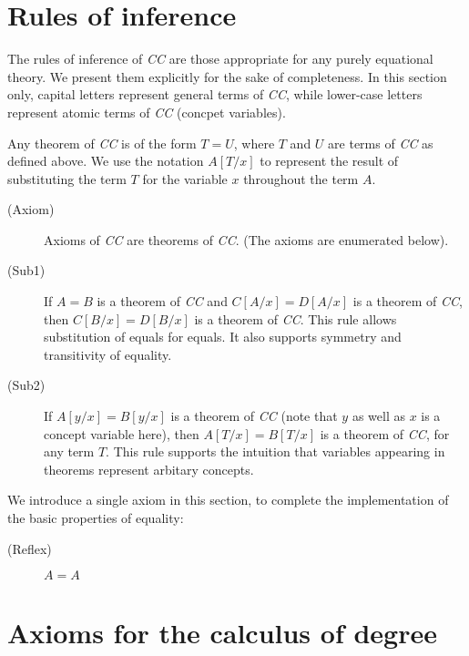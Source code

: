 \section{Rules of inference}

The rules of inference of {\em CC\/} are those appropriate for any
purely equational theory.  We present them explicitly for the sake of
completeness.  In this section only, capital letters represent general
terms of {\em CC\/}, while lower-case letters represent atomic terms
of {\em CC\/} (concpet variables).

Any theorem of {\em CC\/} is of the form $T = U$, where $T$ and $U$
are terms of {\em CC\/} as defined above.  We use the notation
$A[T/x]$ to represent the result of substituting the term $T$ for the
variable $x$ throughout the term $A$.

\begin{description}

\item[(Axiom)]  

Axioms of {\em CC\/} are theorems of {\em CC\/}.  (The axioms are
enumerated below).

\item[(Sub1)]  

If $A = B$ is a theorem of {\em CC\/} and $C[A/x] = D[A/x]$ is a
theorem of {\em CC\/}, then $C[B/x] = D[B/x]$ is a theorem of {\em
CC\/}.  This rule allows substitution of equals for equals.  It also
supports symmetry and transitivity of equality.

\item[(Sub2)]

If $A[y/x] = B[y/x]$ is a theorem of {\em CC\/} (note that $y$ as well
as $x$ is a concept variable here), then $A[T/x] = B[T/x]$ is a
theorem of {\em CC\/}, for any term $T$.  This rule supports the
intuition that variables appearing in theorems represent arbitary
concepts.

\end{description}

We introduce a single axiom in this section, to complete the
implementation of the basic properties of equality:

\begin{description}

\item[(Reflex)]  $A = A$

\end{description}

\section{Axioms for the calculus of degree}

